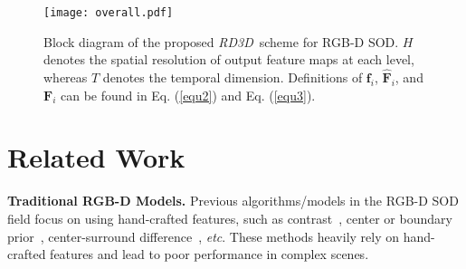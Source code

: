 \documentclass[letterpaper]{article}
\def\etc{\emph{etc}}
\def\ourmodel{\emph{RD3D}}
\begin{document}
\begin{figure*}[!htb]
	\centering
	\texttt{[image: overall.pdf]}\vspace{-0.4cm}
	\caption{\small Block diagram of the proposed \ourmodel~scheme for RGB-D SOD. $H$ denotes the spatial resolution of output feature maps at each level, whereas $T$ denotes the temporal dimension. Definitions of $\mathbf{f}_{i}$, $\mathbf{\hat F}_{i}$, and $\mathbf{F}_{i}$ can be found in Eq. (\ref{equ2}) and Eq. (\ref{equ3}).}\vspace{-0.4cm}
	\label{label1}
\end{figure*}

\section{Related Work}

\noindent \textbf{Traditional RGB-D Models.} Previous algorithms/models in the RGB-D SOD field focus on using hand-crafted features, such as contrast~\cite{cong2016saliency,cheng2014depth,desingh2013depth}, center or boundary prior~\cite{cheng2014depth,cong2019going}, center-surround difference~\cite{ju2014depth,guo2016salient}, \etc. These methods heavily rely on hand-crafted features and lead to poor performance in complex scenes.
\end{document}
